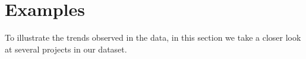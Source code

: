 \section{Examples}
\label{sec:examples}
To illustrate the trends observed in the data, in this section we take a closer look at several projects in our dataset.


